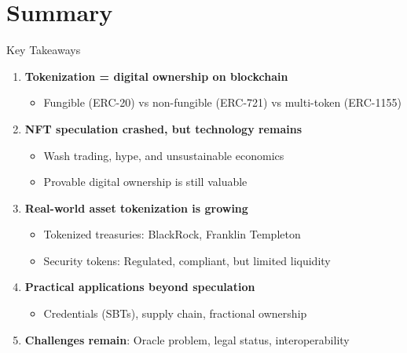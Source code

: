 \documentclass[10pt]{beamer}
\begin{document}
\section{Summary}

\begin{frame}{Key Takeaways}
  \begin{enumerate}
    \item \textbf{Tokenization = digital ownership on blockchain}
    \begin{itemize}
      \item Fungible (ERC-20) vs non-fungible (ERC-721) vs multi-token (ERC-1155)
    \end{itemize}
    
    \vspace{0.3em}
    \item \textbf{NFT speculation crashed, but technology remains}
    \begin{itemize}
      \item Wash trading, hype, and unsustainable economics
      \item Provable digital ownership is still valuable
    \end{itemize}
    
    \vspace{0.3em}
    \item \textbf{Real-world asset tokenization is growing}
    \begin{itemize}
      \item Tokenized treasuries: BlackRock, Franklin Templeton
      \item Security tokens: Regulated, compliant, but limited liquidity
    \end{itemize}
    
    \vspace{0.3em}
    \item \textbf{Practical applications beyond speculation}
    \begin{itemize}
      \item Credentials (SBTs), supply chain, fractional ownership
    \end{itemize}
    
    \vspace{0.3em}
    \item \textbf{Challenges remain}: Oracle problem, legal status, interoperability
  \end{enumerate}
\end{frame}
\end{document}
